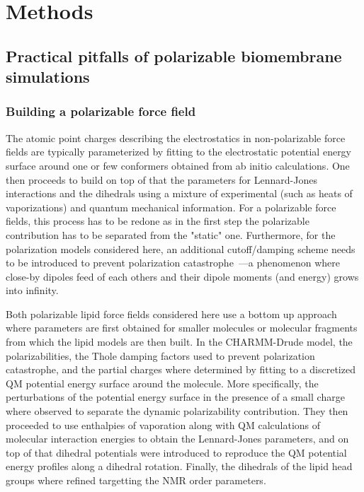 \documentclass[journal=jacsat,manuscript=article,layout=singlecolumn]{achemso}
\begin{document}
\section{Methods}
\subsection{Practical pitfalls of polarizable biomembrane simulations}


\subsubsection{Building a polarizable force field}

The atomic point charges describing the electrostatics in non-polarizable force fields are typically parameterized by fitting to the electrostatic potential energy surface around one or few conformers obtained from ab initio calculations. One then proceeds to build on top of that the parameters for Lennard-Jones interactions and the dihedrals using a mixture of experimental (such as heats of vaporizations) and quantum mechanical information. For a polarizable force fields, this process has to be redone as in the first step the polarizable contribution has to be separated from the "static" one. Furthermore, for the polarization models considered here, an additional cutoff/damping scheme needs to be introduced to prevent polarization catastrophe~\cite{Thole1981}---a phenomenon where close-by dipoles feed of each others and their dipole moments (and energy) grows into infinity.

Both polarizable lipid force fields considered here use a bottom up approach where parameters are first obtained for smaller molecules or molecular fragments from which the lipid models are then built.  In the CHARMM-Drude model, the polarizabilities, the Thole damping factors used to prevent polarization catastrophe, and the partial charges where determined by fitting to a discretized QM potential energy surface around the molecule. More specifically, the perturbations of the potential energy surface in the presence of a small charge where observed to separate the dynamic polarizability contribution. They then proceeded to use enthalpies of vaporation along with QM calculations of molecular interaction energies to obtain the Lennard-Jones parameters, and on top of that dihedral potentials were introduced to reproduce the QM potential energy profiles along a dihedral rotation. Finally, the dihedrals of the lipid head groups where refined targetting the NMR order parameters.
\end{document}
